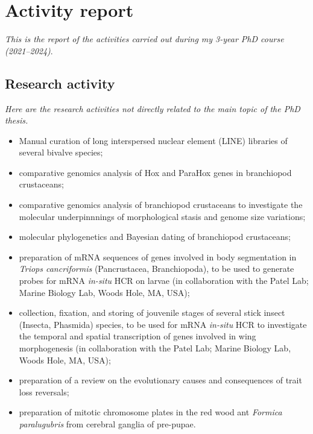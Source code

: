 {
\chapter*{Activity report}
\label{activityreport}
}

\setcounter{page}{1}

\normalsize
\textit{This is the report of the activities carried out during my 3-year PhD course (2021--2024)}.

\section*{Research activity}
\textit{Here are the research activities not directly related to the main topic of the PhD thesis.}
\begin{itemize}
	\item Manual curation of long interspersed nuclear element (LINE) libraries of several bivalve species;
	\item comparative genomics analysis of Hox and ParaHox genes in branchiopod crustaceans;
	\item comparative genomics analysis of branchiopod crustaceans to investigate the molecular underpinnnings of morphological stasis and genome size variations;
	\item molecular phylogenetics and Bayesian dating of branchiopod crustaceans;
	\item preparation of mRNA sequences of genes involved in body segmentation in \textit{Triops cancriformis} (Pancrustacea, Branchiopoda), to be used to generate probes for mRNA \textit{in-situ} HCR on larvae (in collaboration with the Patel Lab; Marine Biology Lab, Woods Hole, MA, USA);
	\item collection, fixation, and storing of jouvenile stages of several stick insect (Insecta, Phasmida) species, to be used for mRNA \textit{in-situ} HCR to investigate the temporal and spatial transcription of genes involved in wing morphogenesis (in collaboration with the Patel Lab; Marine Biology Lab, Woods Hole, MA, USA);
	\item preparation of a review on the evolutionary causes and consequences of trait loss reversals;
	\item preparation of mitotic chromosome plates in the red wood ant \textit{Formica paralugubris} from cerebral ganglia of pre-pupae.

\end{itemize}

